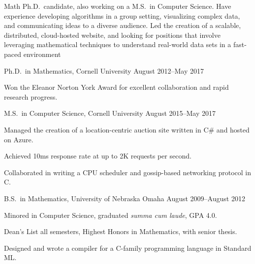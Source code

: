 \documentclass[11pt, letterpaper]{awesome-cv}
\begin{document}
\makecvheader






\begin{cvparagraph}
Math Ph.D.~candidate, also working on a M.S.~in Computer Science. 
Have experience developing algorithms in a group setting, visualizing complex data, and communicating ideas to a diverse audience.
Led the creation of a scalable, distributed, cloud-hosted website, and looking for positions that involve leveraging mathematical techniques to understand real-world data sets in a fast-paced environment
\end{cvparagraph}






\begin{cventries}

\cventry
	{Ph.D.~in Mathematics, Cornell University}
	{}{}
	{August 2012--May 2017}
	{
		\begin{cvitems}
			\item{Won the Eleanor Norton York Award for excellent collaboration and rapid research progress.}
		\end{cvitems}
	}
	
\cventry
	{M.S.~in Computer Science, Cornell University}
	{}{}
	{August 2015--May 2017}
	{
		\begin{cvitems}
			\item{Managed the creation of a location-centric auction site written in C\# and hosted on Azure.}
			\item{Achieved 10ms response rate at up to 2K requests per second.}
			\item{Collaborated in writing a CPU scheduler and gossip-based networking protocol in C.}
		\end{cvitems}
	}
	
\cventry
	{B.S.~in Mathematics, University of Nebraska Omaha}
	{}{}
	{August 2009--August 2012}
	{
		\begin{cvitems}
			\item{Minored in Computer Science, graduated \emph{summa cum laude}, GPA 4.0.}
			\item{Dean's List all semesters, Highest Honors in Mathematics, with senior thesis.}
			\item{Designed and wrote a compiler for a C-family programming language in Standard ML.}
		\end{cvitems}
	}
	
\end{cventries}
\end{document}
